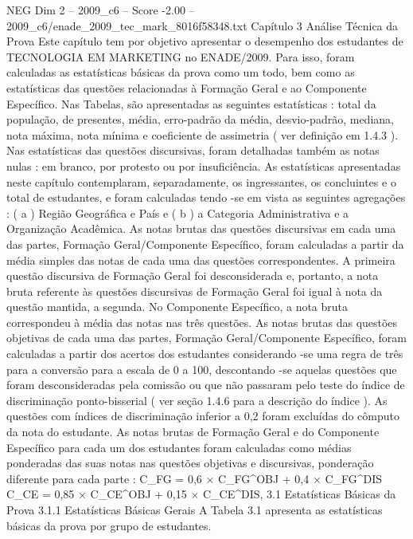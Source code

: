 \begin{textsample}{NEG Dim 2 – 2009\_c6 – Score -2.00 – 2009\_c6/enade\_2009\_tec\_mark\_8016f58348.txt}  \label{ex:f2_neg_133}
Capítulo 3 Análise Técnica da Prova Este capítulo tem por objetivo apresentar o desempenho dos estudantes de TECNOLOGIA EM MARKETING no ENADE/2009.
Para isso, foram calculadas as estatísticas básicas da prova como um todo, bem como as estatísticas das questões relacionadas à Formação Geral e ao Componente Específico.
Nas Tabelas, são apresentadas as seguintes estatísticas : total da população, de presentes, média, erro-padrão da média, desvio-padrão, mediana, nota máxima, nota mínima e coeficiente de assimetria ( ver definição em 1.4.3 ).
Nas estatísticas das questões discursivas, foram detalhadas também as notas nulas : em branco, por protesto ou por insuficiência.
As estatísticas apresentadas neste capítulo contemplaram, separadamente, os ingressantes, os concluintes e o total de estudantes, e foram calculadas tendo -se em vista as seguintes agregações : ( a ) Região Geográfica e País e ( b ) a Categoria Administrativa e a Organização Acadêmica.
As notas brutas das questões discursivas em cada uma das partes, Formação Geral/Componente Específico, foram calculadas a partir da média simples das notas de cada uma das questões correspondentes.
A primeira questão discursiva de Formação Geral foi desconsiderada e, portanto, a nota bruta referente às questões discursivas de Formação Geral foi igual à nota da questão mantida, a segunda.
No Componente Específico, a nota bruta correspondeu à média das notas nas três questões.
As notas brutas das questões objetivas de cada uma das partes, Formação Geral/Componente Específico, foram calculadas a partir dos acertos dos estudantes considerando -se uma regra de três para a conversão para a escala de 0 a 100, descontando -se aquelas questões que foram desconsideradas pela comissão ou que não passaram pelo teste do índice de discriminação ponto-bisserial ( ver seção 1.4.6 para a descrição do índice ).
As questões com índices de discriminação inferior a 0,2 foram excluídas do cômputo da nota do estudante.
As notas brutas de Formação Geral e do Componente Específico para cada um dos estudantes foram calculadas como médias ponderadas das suas notas nas questões objetivas e discursivas, ponderação diferente para cada parte : C\_FG = 0,6 × C\_FG\textasciicircum{}OBJ + 0,4 × C\_FG\textasciicircum{}DIS C\_CE = 0,85 × C\_CE\textasciicircum{}OBJ + 0,15 × C\_CE\textasciicircum{}DIS, 3.1 Estatísticas Básicas da Prova 3.1.1 Estatísticas Básicas Gerais A Tabela 3.1 apresenta as estatísticas básicas da prova por grupo de estudantes.

\end{textsample}
